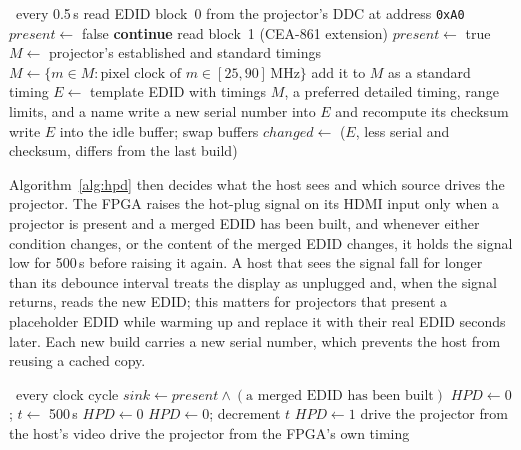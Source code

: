 \documentclass[10pt,journal,compsoc]{IEEEtran}
\newcommand{\SI}[2]{#1\,#2}
\newcommand{\second}{s}\newcommand{\hertz}{Hz}\newcommand{\metre}{m}
\begin{document}
\begin{algorithm}[t]
\caption{Projector detection and EDID merging}
\label{alg:edid}
\begin{algorithmic}[1]
\Loop \ every \SI{0.5}{\second}
  \State read EDID block~0 from the projector's DDC at address \texttt{0xA0}
    \State $\mathit{present} \gets$ false 
    \State \textbf{continue}
  \EndIf
   \State read block~1 (CEA-861 extension) \EndIf
  \State $\mathit{present} \gets$ true
  \State $M \gets$ projector's established and standard timings
  \State $M \gets \{m \in M : \text{pixel clock of } m \in [25, 90]\,\text{MHz}\}$
   \State add it to $M$ as a standard timing \EndIf
  \State $E \gets$ template EDID with timings $M$, a preferred detailed timing, range limits,
         and a name
  \State write a new serial number into $E$ and recompute its checksum
  \State write $E$ into the idle buffer; swap buffers
  \State $\mathit{changed} \gets$ ($E$, less serial and checksum, differs from the last build)
\EndLoop
\end{algorithmic}
\end{algorithm}

Algorithm~\ref{alg:hpd} then decides what the host sees and which source drives the projector.
The FPGA raises the hot-plug signal on its HDMI input only when a projector is present and a
merged EDID has been built, and whenever either condition changes, or the content of the merged
EDID changes, it holds the signal low for \SI{500}{\milli\second} before raising it again. A host
that sees the signal fall for longer than its debounce interval treats the display as unplugged
and, when the signal returns, reads the new EDID; this matters for projectors that present a
placeholder EDID while warming up and replace it with their real EDID seconds later. Each new
build carries a new serial number, which prevents the host from reusing a cached copy.

\begin{algorithm}[b]
\caption{Host hot-plug and source selection}
\label{alg:hpd}
\begin{algorithmic}[1]
\Loop \ every clock cycle
  \State $\mathit{sink} \gets \mathit{present} \wedge (\text{a merged EDID has been built})$
    \State $\mathit{HPD} \gets 0$; $t \gets$ \SI{500}{\milli\second}
   \State $\mathit{HPD} \gets 0$
   \State $\mathit{HPD} \gets 0$; decrement $t$
  \Else \State $\mathit{HPD} \gets 1$ 
  \EndIf
    \State drive the projector from the host's video 
  \ElsIf{decoding has been lost for \SI{0.5}{\second}}
    \State drive the projector from the FPGA's own timing 
  \EndIf
\EndLoop
\end{algorithmic}
\end{algorithm}
\end{document}
